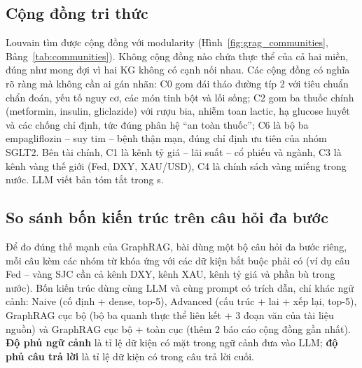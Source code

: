 \subsection{Cộng đồng tri thức}
Louvain tìm được  cộng đồng với modularity 
(Hình~\ref{fig:grag_communities}, Bảng~\ref{tab:communities}). Không cộng đồng nào chứa thực thể của cả hai miền,
đúng như mong đợi vì hai KG không có cạnh nối nhau. Các cộng đồng có nghĩa rõ ràng mà không cần ai gán nhãn: C0
gom đái tháo đường típ 2 với tiêu chuẩn chẩn đoán, yếu tố nguy cơ, các món tinh bột và lối sống; C2 gom ba thuốc
chính (metformin, insulin, gliclazide) với rượu bia, nhiễm toan lactic, hạ glucose huyết và các chống chỉ định,
tức đúng phân hệ ``an toàn thuốc''; C6 là bộ ba empagliflozin -- suy tim -- bệnh thận mạn, đúng chỉ định ưu tiên
của nhóm SGLT2. Bên tài chính, C1 là kênh tỷ giá -- lãi suất -- cổ phiếu và ngành, C3 là kênh vàng thế giới (Fed,
DXY, XAU/USD), C4 là chính sách vàng miếng trong nước. LLM viết  bản tóm tắt trong
 s.



\subsection{So sánh bốn kiến trúc trên câu hỏi đa bước}
Để đo đúng thế mạnh của GraphRAG, bài dùng một bộ  câu hỏi đa bước riêng, mỗi câu kèm các nhóm từ
khóa ứng với các dữ kiện bắt buộc phải có (ví dụ câu Fed -- vàng SJC cần cả kênh DXY, kênh XAU, kênh tỷ giá và
phần bù trong nước). Bốn kiến trúc dùng cùng LLM và cùng prompt có trích dẫn, chỉ khác ngữ cảnh:
Naive (cố định + dense, top-5), Advanced (cấu trúc + lai + xếp lại, top-5), GraphRAG cục bộ (bộ ba quanh thực thể
liên kết + 3 đoạn văn của tài liệu nguồn) và GraphRAG cục bộ + toàn cục (thêm 2 báo cáo cộng đồng gần nhất).
\textbf{Độ phủ ngữ cảnh} là tỉ lệ dữ kiện có mặt trong ngữ cảnh đưa vào LLM; \textbf{độ phủ câu trả lời} là tỉ lệ dữ
kiện có trong câu trả lời cuối.


